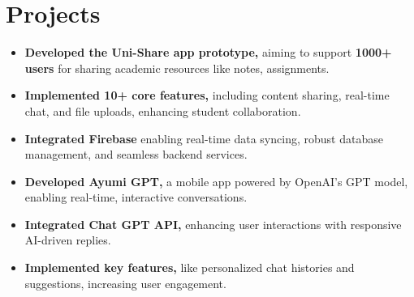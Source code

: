 \documentclass[]{deedy-resume-openfont}
\begin{document}
\begin{minipage}[t]{0.66\textwidth}
\section{Projects}
\begin{itemize}[leftmargin=*]
    \item \textbf{Developed the Uni-Share app prototype,} aiming to support \textbf {1000+ users} for sharing academic resources like notes, assignments.
    \vspace{-2.3mm} %
    \item \textbf{Implemented 10+ core features,} including content sharing, real-time chat, and file uploads, enhancing student collaboration.
    \vspace{-2.3mm}
    \item \textbf{Integrated Firebase} enabling real-time data syncing, robust database management, and seamless backend services.
\end{itemize}
\sectionsep

\begin{itemize}[leftmargin=*]
    \item \textbf{Developed Ayumi GPT,} a mobile app powered by OpenAI’s GPT model, enabling real-time, interactive conversations.
    \vspace{-2.4mm} %
    \item \textbf{Integrated Chat GPT API,} enhancing user interactions with responsive AI-driven replies.
    \vspace{-2.4mm}
    \item \textbf{Implemented key features,} like personalized chat histories and suggestions, increasing user engagement.
\end{itemize}
\sectionsep

\end{minipage} 
\end{document}
